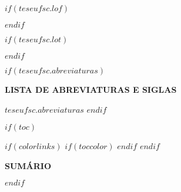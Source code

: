 \onehalfspacing
$if(teseufsc.lof)$
  \clearpage
  {
    \renewcommand{\listfigurename}{LISTA DE FIGURAS}
    \listoffigures
    \thispagestyle{empty}
    \clearpage
  }
$endif$

\onehalfspacing
$if(teseufsc.lot)$
  \clearpage
  {
    \renewcommand{\listtablename}{LISTA DE TABELAS}
    \listoftables
    \thispagestyle{empty}
    \clearpage
  }
$endif$


$if(teseufsc.abreviaturas)$
\clearpage

\begin{center}
\textbf{LISTA DE ABREVIATURAS E SIGLAS}
\end{center}
\vspace{1.5em}
\noindent \onehalfspacing
$teseufsc.abreviaturas$
\thispagestyle{empty}
$endif$


$if(toc)$
  \clearpage
  {
    $if(colorlinks)$
      $if(toccolor)$
       \hypersetup{linkcolor=$toccolor$}
      $endif$
   $endif$
    
    \setcounter{tocdepth}{$toc-depth$}
    
    \renewcommand{\contentsname}{}
    
    \begin{center}
    \textbf{SUMÁRIO}
    \end{center}
    \vspace{1.5em}
    \pagestyle{empty}
    \tableofcontents
    \cleardoublepage
    \pagestyle{fancy}
  }
$endif$
